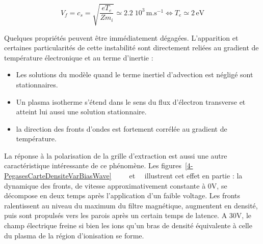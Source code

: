 \begin{refsection}
 \begin{equation}
 	V_f=c_{s}=\sqrt{\frac{eT_e}{Zm_i}}\simeq 2.2\;10^{3}\,\text{m.s}^{-1}
 	\Leftrightarrow T_e\simeq 2\,\text{eV}
 \end{equation}
 
 Quelques propriétés peuvent être immédiatement dégagées. L'apparition et
 certaines particularités de cette instabilité sont directement reliées au
 gradient de température électronique et au terme d'inertie  :
 
 \begin{itemize}
   	\item Les solutions du modèle quand le terme inertiel d'advection est
	négligé sont stationnaires.
   \item Un plasma isotherme s'étend dans le sens du flux d'électron
   transverse et atteint lui aussi une solution stationnaire.
   \item la direction des fronts d'ondes est fortement corrélée au gradient
   de température.
\end{itemize}

La réponse à la polarisation de la grille d'extraction est aussi une autre
caractéristique intéressante de ce phénomène. Les
figures~\ref{4-PegasesCarteDensiteVarBiasWave}~
~ ~
et~~ illustrent cet effet en partie : la
dynamique des fronts, de vitesse approximativement constante à 0V, se décompose
en deux temps après l'application d'un faible voltage. Les fronts ralentissent
au niveau du maximum du filtre magnétique, augmentent en densité, puis sont
propulsés vers les parois après un certain temps de latence. A 30V, le champ
électrique freine si bien les ions qu'un bras de densité équivalente à celle du
plasma de la région d'ionisation se forme. 
	

\end{refsection}
